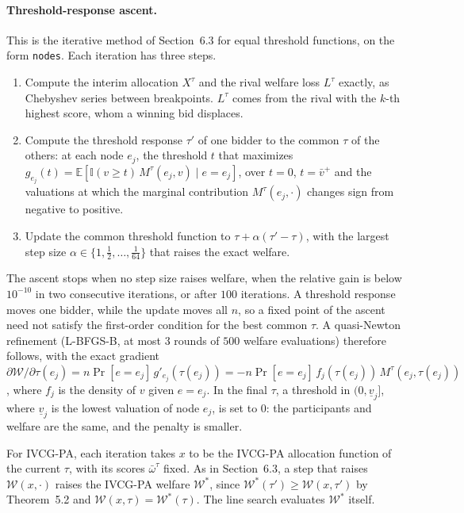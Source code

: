 \documentclass[11pt]{article}
\newcommand{\W}{\mathcal{W}}
\newcommand{\code}[1]{\texttt{#1}}
\newcommand{\vplus}{\bar v^{+}}
\begin{document}
\paragraph{Threshold-response ascent.} This is the iterative method of Section~6.3 for equal threshold functions, on the form \code{nodes}. Each iteration has three steps.
\begin{enumerate}
    \item Compute the interim allocation $X^\tau$ and the rival welfare loss $L^\tau$ exactly, as Chebyshev series between breakpoints. $L^\tau$ comes from the rival with the $k$-th highest score, whom a winning bid displaces.
    \item Compute the threshold response $\tau'$ of one bidder to the common $\tau$ of the others: at each node $e_j$, the threshold $t$ that maximizes $g_{e_j}(t)=\mathbb{E}[\mathbb{I}(v\geq t)\,M^\tau(e_j,v)\mid e=e_j]$, over $t=0$, $t=\vplus$ and the valuations at which the marginal contribution $M^\tau(e_j,\cdot)$ changes sign from negative to positive.
    \item Update the common threshold function to $\tau+\alpha(\tau'-\tau)$, with the largest step size $\alpha\in\{1,\tfrac12,\dots,\tfrac1{64}\}$ that raises the exact welfare.
\end{enumerate}
The ascent stops when no step size raises welfare, when the relative gain is below $10^{-10}$ in two consecutive iterations, or after $100$ iterations. A threshold response moves one bidder, while the update moves all $n$, so a fixed point of the ascent need not satisfy the first-order condition for the best common $\tau$. A quasi-Newton refinement (L-BFGS-B, at most $3$ rounds of $500$ welfare evaluations) therefore follows, with the exact gradient $\partial\W/\partial\tau(e_j)=n\Pr[e=e_j]\,g'_{e_j}(\tau(e_j))=-n\Pr[e=e_j]\,f_j(\tau(e_j))\,M^\tau(e_j,\tau(e_j))$, where $f_j$ is the density of $v$ given $e=e_j$. In the final $\tau$, a threshold in $(0,\underline v_j]$, where $\underline v_j$ is the lowest valuation of node $e_j$, is set to $0$: the participants and welfare are the same, and the penalty is smaller.

For IVCG-PA, each iteration takes $x$ to be the IVCG-PA allocation function of the current $\tau$, with its scores $\bar\omega^\tau$ fixed. As in Section~6.3, a step that raises $\W(x,\cdot)$ raises the IVCG-PA welfare $\W^*$, since $\W^*(\tau')\geq\W(x,\tau')$ by Theorem~5.2 and $\W(x,\tau)=\W^*(\tau)$. The line search evaluates $\W^*$ itself.
\end{document}
